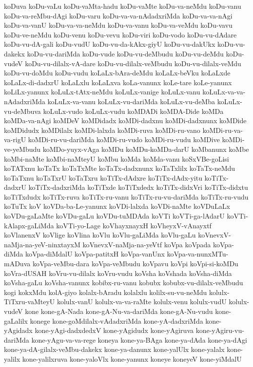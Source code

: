 {koDuva
koDu-vaLu
koDu-vaMta-hadu
koDu-vaMte
koDu-va-neMdu
koDu-vanu
koDu-va-reMbu-dAgi
koDu-varu
koDu-va-va-nAdadxriMda
koDu-va-va-nAgi
koDu-va-vanU
koDu-va-va-neMdu
koDu-va-vanu
koDu-va-veMdu
koDu-vavu
koDu-ve-neMdu
koDu-venu
koDu-vevu
koDu-viri
koDu-vodo
koDu-vu-dAdare
koDu-vu-dA-gali
koDu-vudU
koDu-vu-da-kAkx-giyU
koDu-vu-dakUkx
koDu-vu-dakekx
koDu-vu-dariMda
koDu-vude
koDu-vu-deMbudu
koDu-vu-deMdu
koDu-vudeV
koDu-vu-dilalx-vA-dare
koDu-vu-dilalx-veMbudu
koDu-vu-dilalx-veMdu
koDu-vu-doMdu
koDu-vudu
koLaLx-bAra-deMdu
koLaLx-beVku
koLaLxde
koLaLx-di-dadxrU
koLaLxlu
koLaLxva
koLa-vanunx
koLe-tare
koLe-yanunx
koLiLx-yanunx
koLuLx-tAtx-neMdu
koLuLx-vanige
koLuLx-vanu
koLuLx-va-va-nAdadxriMda
koLuLx-va-vanu
koLuLx-vu-dariMda
koLuLx-vu-deMba
koLuLx-vu-deMbuva
koLuLx-vudo
koLuLx-vudu
koMDADi
koMDA-Dide
koMDa
koMDa-va-nAgi
koMDeV
koMDidadx
koMDi-dadxnu
koMDi-dadxnunx
koMDide
koMDidudx
koMDilalx
koMDi-lalxda
koMDi-ruva
koMDi-ru-vano
koMDi-ru-va-va-rigU
koMDi-ru-vu-dariMda
koMDi-ru-vudo
koMDi-ru-vudu
koMDive
koMDi-ve-yeMbudu
koMDo-yuyx-vAga
koMDu
koMDu-koMDa-darU
koMbanunx
koMbe
koMbi-naMte
koMbi-naMteyU
koMbu
koMda
koMda-vanu
koSxVBe-goLisi
koTATxnu
koTaTx
koTaTxMte
koTaTx-dadxnunx
koTaTxlilx
koTaTx-neMdu
koTaTxnu
koTaTxrU
koTaTxru
koTiTx-dAdxre
koTiTx-dAdx-yitu
koTiTx-dadxrU
koTiTx-dadxriMda
koTiTxde
koTiTxdedx
koTiTx-didxVri
koTiTx-didxtu
koTiTxdudx
koTiTx-ruva
koTiTx-ru-vanu
koTiTx-ru-vu-dariMda
koTiTx-ru-vudu
koTuTx
koV
koVDa-ba-Le-yanunx
koVDi-lalxda
koVDi-naMte
koVDuLaLx
koVDu-gaLaMte
koVDu-gaLu
koVDu-tuMDAda
koVTi
koVTi-ga-lAdarU
koVTi-kAlapx-gaLiMda
koVTi-yo-Lage
koVhayxnayxH
koVheyxV-vAnayxtf
koVlanenxV
koVlige
koVlina
koVlu
koVlu-gaLiMda
koVlu-gaLu
koVnevxV-naMja-na-yeV-ninxtayxM
koVnevxV-naMja-na-yeVtf
koVpa
koVpada
koVpa-diMda
koVpa-diMdalU
koVpa-patitxH
koVpa-vanUnx
koVpa-va-nunxMTu-mADuva
koVpa-veMbu-dara
koVpa-veMbudu
koVpavu
koVpi
koVpi-si-koMDu
koVra-dUSAH
koVru-vu-dilalx
koVru-vudu
koVsha
koVshada
koVsha-diMda
koVsha-gaLu
koVsha-vanunx
kobibx-ru-vanu
kobubx
kobubx-vu-dilalx-veMbudu
kogi
kokxMdu
kolA-giyo
kolalx-bAradu
kolalxlu
kolilx-su-vu-neMdu
kolulx-TiTxru-vaMteyU
kolulx-vanU
kolulx-va-va-raMte
kolulx-venu
kolulx-vudU
kolulx-vudeV
kone
kone-gA-Nada
kone-gA-Nu-va-dariMda
kone-gA-Nu-vudu
kone-gaLalilx
konege
kone-goMdilalx-vAdadxriMda
kone-yA-dadxriMda
kone-yAgidadx
kone-yAgi-dadxdedxV
kone-yAgidudx
kone-yAgiruva
kone-yAgiru-vu-dariMda
kone-yAgu-va-va-rege
koneya
kone-ya-BAga
kone-ya-dAda
kone-ya-dAgi
kone-ya-dA-gilalx-veMbu-dakekx
kone-ya-danunx
kone-yalUlx
kone-yalalx
kone-yalilx
kone-yalilxruva
kone-yaloVlx
kone-yanunx
koneye
koneyeV
kone-yiMdalU
}
